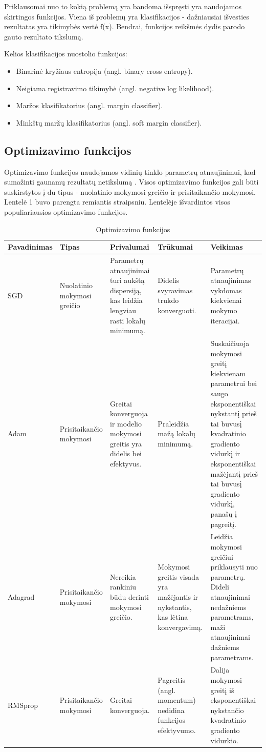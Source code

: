 \documentclass{VUMIFPSbakalaurinis}
\begin{document}
Priklausomai nuo to kokią problemą yra bandoma išspręsti yra naudojamos skirtingos funkcijos. Viena iš problemų yra klasifikacijos - dažniausiai išvesties
rezultatas yra tikimybės vertė f(x). Bendrai, funkcijos reikšmės dydis parodo gauto rezultato tikslumą.

Kelios klasifikacijos nuostolio funkcijos:
\begin{itemize}
\item Binarinė kryžiaus entropija (angl. binary cross entropy).
\item Neigiama registravimo tikimybė (angl. negative log likelihood).
\item Maržos klasifikatorius (angl. margin classifier).
\item Minkštų maržų klasifikatorius (angl. soft margin classifier).
\end{itemize}

\subsection{Optimizavimo funkcijos}
Optimizavimo funkcijos naudojamos vidinių tinklo parametrų atnaujinimui, kad sumažinti gaunamų rezultatų netikslumą \cite{Niknafs2016NeuralNO}. 
Visos optimizavimo funkcijos gali būti suskirstytos į du tipus - nuolatinio mokymosi greičio ir prisitaikančio mokymosi. 
Lentelė 1 buvo parengta remiantis \cite{DBLP:journals/corr/Ruder16} straipsniu. Lentelėje išvardintos visos populiariausios optimizavimo funkcijos.

\begin{longtable}[h!]{ | p{2cm} | p{2.2cm} | p{2.5cm} | p{2.5cm} | p{4.5cm} | } 
\caption{Optimizavimo funkcijos} \\ \hline
Pavadinimas & Tipas & Privalumai & Trūkumai & Veikimas \\ \hline
\endhead
SGD & Nuolatinio mokymosi greičio & Parametrų atnaujinimai turi aukštą dispersiją, kas leidžia lengviau rasti lokalų minimumą. & Didelis svyravimas trukdo konverguoti. & Parametrų atnaujinimas vykdomas kiekvienai mokymo iteracijai. \\ \hline
Adam & Prisitaikančio mokymosi & Greitai konverguoja ir modelio mokymosi greitis yra didelis bei efektyvus. & Praleidžia mažą lokalų minimumą. & Suskaičiuoja mokymosi greitį kiekvienam parametrui bei saugo eksponentiškai nykstantį prieš tai buvusį kvadratinio gradiento vidurkį ir eksponentiškai mažėjantį prieš tai buvusį gradiento vidurkį, panašų į pagreitį. \\ \hline
Adagrad & Prisitaikančio mokymosi & Nereikia rankiniu būdu derinti mokymosi greičio. & Mokymosi greitis visada yra mažėjantis ir nykstantis, kas lėtina konvergavimą. & Leidžia mokymosi greičiui priklausyti nuo parametrų. Dideli atnaujinimai nedažniems parametrams, maži atnaujinimai dažniems parametrams. \\ \hline
RMSprop & Prisitaikančio mokymosi & Greitai konverguoja. & Pagreitis (angl. momentum) nedidina funkcijos efektyvumo. & Dalija mokymosi greitį iš eksponentiškai nykstančio kvadratinio gradiento vidurkio. \\ \hline
\end{longtable}
\end{document}
